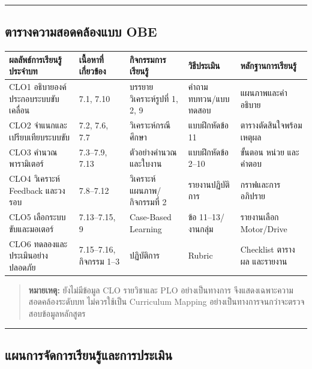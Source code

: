 \par\noindent\rule{\textwidth}{0.4pt}\par

\subsection{ตารางความสอดคล้องแบบ OBE}

\begin{table}[htbp]
    \centering
    \begin{tabular}{l l l l l}
        \hline
        \textbf{ผลลัพธ์การเรียนรู้ประจำบท} & \textbf{เนื้อหาที่เกี่ยวข้อง} & \textbf{กิจกรรมการเรียนรู้} & \textbf{วิธีประเมิน} & \textbf{หลักฐานการเรียนรู้} \\
        \hline
        CLO1 อธิบายองค์ประกอบระบบขับเคลื่อน & 7.1, 7.10 & บรรยาย วิเคราะห์รูปที่ 1, 2, 9 & คำถามทบทวน/แบบทดสอบ & แผนภาพและคำอธิบาย \\
        CLO2 จำแนกและเปรียบเทียบระบบขับ & 7.2, 7.6, 7.7 & วิเคราะห์กรณีศึกษา & แบบฝึกหัดข้อ 11 & ตารางตัดสินใจพร้อมเหตุผล \\
        CLO3 คำนวณพารามิเตอร์ & 7.3–7.9, 7.13 & ตัวอย่างคำนวณและใบงาน & แบบฝึกหัดข้อ 2–10 & ขั้นตอน หน่วย และคำตอบ \\
        CLO4 วิเคราะห์ Feedback และวงรอบ & 7.8–7.12 & วิเคราะห์แผนภาพ/กิจกรรมที่ 2 & รายงานปฏิบัติการ & กราฟและการอภิปราย \\
        CLO5 เลือกระบบขับและมอเตอร์ & 7.13–7.15, 9 & Case-Based Learning & ข้อ 11–13/งานกลุ่ม & รายงานเลือก Motor/Drive \\
        CLO6 ทดลองและประเมินอย่างปลอดภัย & 7.15–7.16, กิจกรรม 1–3 & ปฏิบัติการ & Rubric & Checklist ตารางผล และรายงาน \\
        \hline
    \end{tabular}
\end{table}

\begin{quote}
    \textbf{หมายเหตุ:} ยังไม่มีข้อมูล CLO รายวิชาและ PLO อย่างเป็นทางการ จึงแสดงเฉพาะความสอดคล้องระดับบท ไม่ควรใช้เป็น Curriculum Mapping อย่างเป็นทางการจนกว่าจะตรวจสอบข้อมูลหลักสูตร
\end{quote}

\par\noindent\rule{\textwidth}{0.4pt}\par

\subsection{แผนการจัดการเรียนรู้และการประเมิน}


